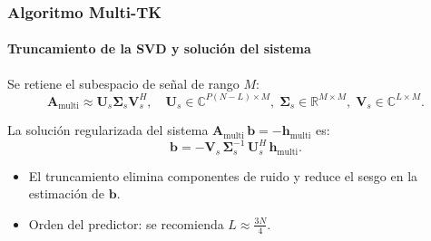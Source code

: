 \documentclass{beamer}
\begin{document}
\begin{frame}
\frametitle{Algoritmo Multi-TK}
\framesubtitle{Truncamiento de la SVD y solución del sistema}

Se retiene el subespacio de señal de rango $M$:
\begin{equation}
\mathbf{A}_{\text{multi}} \approx \mathbf{U}_s \boldsymbol{\Sigma}_s \mathbf{V}_s^H,
\quad
\mathbf{U}_s \in \mathbb{C}^{P(N-L)\times M},\;
\boldsymbol{\Sigma}_s \in \mathbb{R}^{M\times M},\;
\mathbf{V}_s \in \mathbb{C}^{L\times M}.
\label{eq:truncsvd}
\end{equation}

La solución regularizada del sistema $\mathbf{A}_{\text{multi}}\,\mathbf{b} = -\mathbf{h}_{\text{multi}}$ es:
\begin{equation}
\boxed{\mathbf{b} = -\mathbf{V}_s\,\boldsymbol{\Sigma}_s^{-1}\,\mathbf{U}_s^H\,\mathbf{h}_{\text{multi}}}.
\label{eq:solution}
\end{equation}

\begin{itemize}
\item El truncamiento elimina componentes de ruido y reduce el sesgo en la estimación de $\mathbf{b}$.
\item Orden del predictor: se recomienda $L \approx \tfrac{3N}{4}$.
\end{itemize}
\end{frame}



\end{document}
